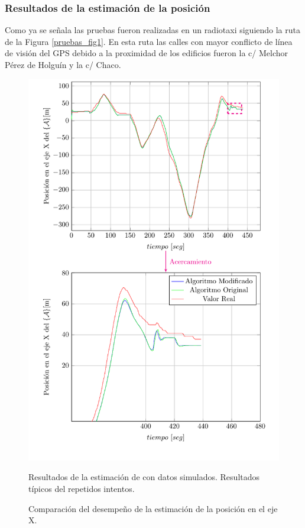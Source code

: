 \documentclass[10pt]{report}
\numberwithin{equation}{chapter}
\numberwithin{algorithm}{chapter}
\begin{document}
\subsubsection{Resultados de la estimación de la posición}
Como ya se señala las pruebas fueron realizadas en un radiotaxi siguiendo la ruta de la Figura \ref{pruebas_fig1}. En esta ruta las calles con mayor conflicto de línea de visión del GPS debido a la proximidad de los edificios fueron la c/ Melchor Pérez de Holguín y la c/ Chaco.\par
\begin{figure}
\begin{center}
\includegraphics[scale=0.8]
{PlotX4b.pdf}
\caption{Comparación del desempeño de la estimación de la posición en el eje X.}
\scriptsize{Resultados de la estimación de con datos simulados. Resultados típicos del repetidos intentos.}
\label{PlotX1}
\end{center}
\end{figure}
\end{document}
